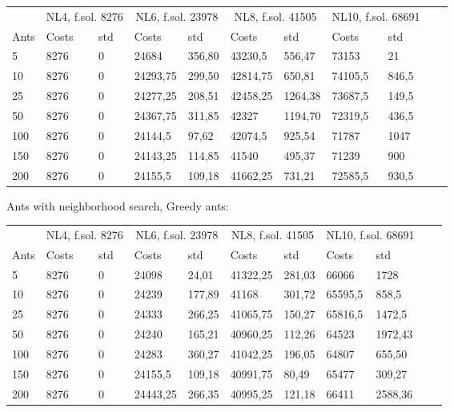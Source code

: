 \begin{minipage}[b]{1.0\textwidth}
    \begin{tabular}{ l | ll | ll | ll | ll | ll}
	\hline
	& \multicolumn{2}{c}{NL4, f.sol. 8276} & \multicolumn{2}{c}{NL6, f.sol. 23978}
	& \multicolumn{2}{c}{NL8, f.sol. 41505} & \multicolumn{2}{c}{NL10, f.sol. 68691} \\
	\cline{1-9}
	Ants & Costs & std & Costs & std & Costs & std & Costs & std \\
	\hline
	5     &  8276    & 0 &  24684    & 356,80 &  43230,5    & 556,47 &  73153  &	21 \\
	10    &  8276    & 0 &  24293,75 & 299,50 &  42814,75    & 650,81 &  74105,5    & 846,5 \\
	25    &  8276    & 0 &  24277,25 & 208,51 &  42458,25    & 1264,38 &  73687,5    & 149,5 \\
	50    &  8276    & 0 &  24367,75 & 311,85 &  42327    & 1194,70 &  72319,5    & 436,5\\
	100   &  8276    & 0 &  24144,5  & 97,62  &  42074,5    & 925,54 &  71787    & 1047 \\
	150   &  8276    & 0 &  24143,25 & 114,85 &  41540    & 495,37 &  71239   & 900\\
	200   &  8276    & 0 &  24155,5  & 109,18 &  41662,25    & 731,21 &  72585,5    & 930,5\\
	\hline
	\end{tabular}
\end{minipage}
\newline
Ants with neighborhood search, Greedy ants:
\newline
\begin{minipage}[b]{1.0\textwidth}
    \begin{tabular}{ l | ll | ll | ll | ll | ll}
	\hline
	& \multicolumn{2}{c}{NL4, f.sol. 8276} & \multicolumn{2}{c}{NL6, f.sol. 23978}
	& \multicolumn{2}{c}{NL8, f.sol. 41505} & \multicolumn{2}{c}{NL10, f.sol. 68691} \\
	\cline{1-9}
	Ants & Costs & std & Costs & std & Costs & std & Costs & std \\
	\hline
	5     &  8276  & 0 &    24098   & 24,01  &  41322,25    & 281,03 &  66066   & 1728 \\
	10    &  8276  & 0 &    24239   & 177,89 &  41168       & 301,72 &  65595,5   & 858,5 \\
	25    &  8276  & 0 &    24333   & 266,25 &  41065,75    & 150,27 &  65816,5    & 1472,5 \\
	50    &  8276  & 0 &    24240   & 165,21 &  40960,25    & 112,26 &  64523    & 1972,43 \\
	100   &  8276  & 0 &    24283   & 360,27 &  41042,25    & 196,05 &  64807    & 655,50 \\
	150   &  8276  & 0 &  24155,5   & 109,18 &  40991,75    & 80,49  &  65477    & 309,27 \\
	200   &  8276  & 0 &  24443,25  & 266,35 &  40995,25    & 121,18 &  66411    & 2588,36	\\
	\hline
	\end{tabular}
\end{minipage}
